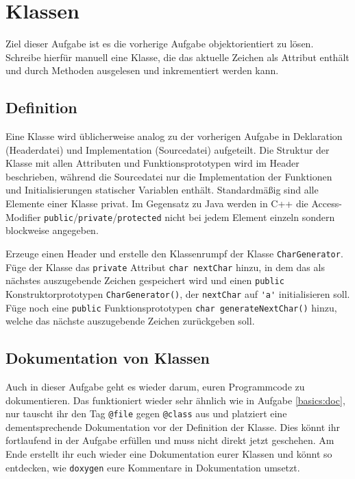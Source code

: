 \section{Klassen}
Ziel dieser Aufgabe ist es die vorherige Aufgabe objektorientiert zu lösen. Schreibe hierfür manuell eine Klasse, die das aktuelle Zeichen als Attribut enthält und durch Methoden ausgelesen und inkrementiert werden kann.


\subsection{Definition}
Eine Klasse wird üblicherweise analog zu der vorherigen Aufgabe in Deklaration (Headerdatei) und Implementation (Sourcedatei) aufgeteilt.
Die Struktur der Klasse mit allen Attributen und Funktionsprototypen wird im Header beschrieben, während die Sourcedatei nur die Implementation der Funktionen und Initialisierungen statischer Variablen enthält.
Standardmäßig sind alle Elemente einer Klasse privat.
Im Gegensatz zu Java werden in C++ die Access-Modifier \lstinline{public}/\lstinline{private}/\lstinline{protected} nicht bei jedem Element einzeln sondern blockweise angegeben.



Erzeuge einen Header  und erstelle den Klassenrumpf der Klasse \lstinline{CharGenerator}.
Füge der Klasse das \lstinline{private} Attribut \lstinline{char nextChar} hinzu, in dem das als nächstes auszugebende Zeichen gespeichert wird und einen \lstinline{public} Konstruktorprototypen \lstinline{CharGenerator()}, der \lstinline{nextChar} auf \lstinline{'a'} initialisieren soll.
Füge noch eine \lstinline{public} Funktionsprototypen \lstinline{char generateNextChar()} hinzu, welche das nächste auszugebende Zeichen zurückgeben soll.



\subsection{Dokumentation von Klassen}
Auch in dieser Aufgabe geht es wieder darum, euren Programmcode zu dokumentieren.
Das funktioniert wieder sehr ähnlich wie in Aufgabe \ref{basics:doc}, nur tauscht ihr den Tag \lstinline{@file} gegen \lstinline{@class} aus und platziert eine dementsprechende Dokumentation vor der Definition der Klasse.
Dies könnt ihr fortlaufend in der Aufgabe erfüllen und muss nicht direkt jetzt geschehen.
Am Ende erstellt ihr euch wieder eine Dokumentation eurer Klassen und könnt so entdecken, wie \texttt{doxygen} eure Kommentare in Dokumentation umsetzt.

